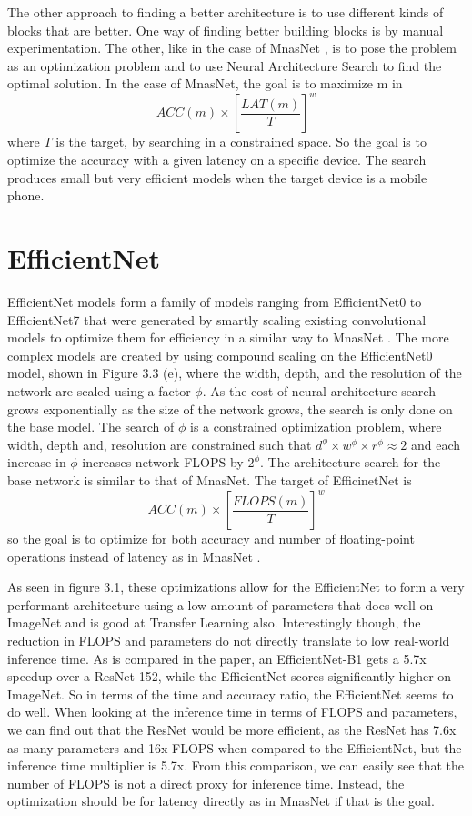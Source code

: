 The other approach to finding a better architecture is to use different kinds of blocks that are better. One way of finding better building blocks is by manual experimentation. The other, like in the case of MnasNet \citep{mnas}, is to pose the problem as an optimization problem and to use Neural Architecture Search \citep{neuralSearch} to find the optimal solution. In the case of MnasNet, the goal is to maximize m in \[ACC(m) \times [\frac{LAT(m)}{T}]^w \] \noindent where ${T}$ is the target, by searching in a constrained space. So the goal is to optimize the accuracy with a given latency on a specific device. The search produces small but very efficient models when the target device is a mobile phone.

\section{EfficientNet}
EfficientNet models form a family of models ranging from EfficientNet0 to EfficientNet7 that were generated by smartly scaling existing convolutional models to optimize them for efficiency in a similar way to MnasNet \citep{efficientNet}.
The more complex models are created by using compound scaling on the EfficientNet0 model, shown in Figure 3.3 (e),  where the width, depth, and the resolution of the network are scaled using a factor ${\phi}$.
As the cost of neural architecture search grows exponentially as the size of the network grows, the search is only done on the base model.
The search of ${\phi}$ is a constrained optimization problem, where width, depth and, resolution are constrained such that ${d^\phi \times w^\phi \times r^\phi \approx 2}$ and each increase in ${\phi}$ increases network FLOPS by ${2^\phi}$.
The architecture search for the base network is similar to that of MnasNet. The target of EfficinetNet is  \[ACC(m) \times [\frac{FLOPS(m)}{T}]^w\] \noindent so the goal is to optimize for both accuracy and number of floating-point operations instead of latency as in MnasNet \citep{efficientNet}.

As seen in figure 3.1, these optimizations allow for the EfficientNet to form a very performant architecture using a low amount of parameters that does well on ImageNet and is good at Transfer Learning also. Interestingly though, the reduction in FLOPS and parameters do not directly translate to low real-world inference time. As is compared in the paper, an EfficientNet-B1 gets a 5.7x speedup over a ResNet-152, while the EfficientNet scores significantly higher on ImageNet. So in terms of the time and accuracy ratio, the EfficientNet seems to do well. When looking at the inference time in terms of FLOPS and parameters, we can find out that the ResNet would be more efficient, as the ResNet has 7.6x as many parameters and 16x FLOPS when compared to the EfficientNet, but the inference time multiplier is 5.7x. From this comparison, we can easily see that the number of FLOPS is not a direct proxy for inference time.
Instead, the optimization should be for latency directly as in MnasNet if that is the goal.

